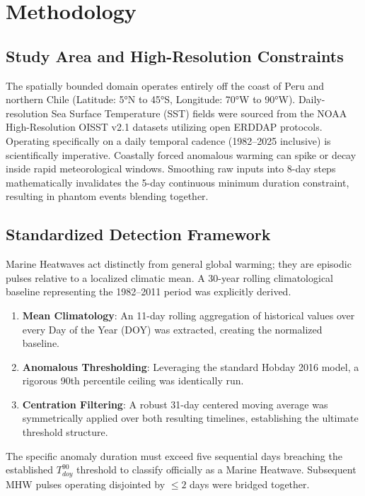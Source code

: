 \documentclass[11pt,a4paper]{article}
\begin{document}
\section{Methodology}

\subsection{Study Area and High-Resolution Constraints}
The spatially bounded domain operates entirely off the coast of Peru and northern Chile (Latitude: 5°N to 45°S, Longitude: 70°W to 90°W). Daily-resolution Sea Surface Temperature (SST) fields were sourced from the NOAA High-Resolution OISST v2.1 datasets utilizing open ERDDAP protocols.
Operating specifically on a daily temporal cadence (1982–2025 inclusive) is scientifically imperative. Coastally forced anomalous warming can spike or decay inside rapid meteorological windows. Smoothing raw inputs into 8-day steps mathematically invalidates the 5-day continuous minimum duration constraint, resulting in phantom events blending together.

\subsection{Standardized Detection Framework}
Marine Heatwaves act distinctly from general global warming; they are episodic pulses relative to a localized climatic mean. A 30-year rolling climatological baseline representing the 1982–2011 period was explicitly derived.
\begin{enumerate}
    \item \textbf{Mean Climatology}: An 11-day rolling aggregation of historical values over every Day of the Year (DOY) was extracted, creating the normalized baseline.
    \item \textbf{Anomalous Thresholding}: Leveraging the standard Hobday 2016 model, a rigorous 90th percentile ceiling was identically run.
    \item \textbf{Centration Filtering}: A robust 31-day centered moving average was symmetrically applied over both resulting timelines, establishing the ultimate threshold structure.
\end{enumerate}
The specific anomaly duration must exceed five sequential days breaching the established $T^{90}_{doy}$ threshold to classify officially as a Marine Heatwave. Subsequent MHW pulses operating disjointed by $\leq 2$ days were bridged together.
\end{document}
